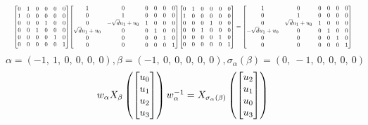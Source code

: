 \documentclass[11pt]{article}
\theoremstyle{definition}
\begin{document}
\[
\scaletoalign{\textwidth}{{\left[\begin{matrix}0 & 1 & 0 & 0 & 0 & 0\\1 & 0 & 0 & 0 & 0 & 0\\0 & 0 & 0 & 1 & 0 & 0\\0 & 0 & 1 & 0 & 0 & 0\\0 & 0 & 0 & 0 & 1 & 0\\0 & 0 & 0 & 0 & 0 & 1\end{matrix}\right]} {\left[\begin{matrix}1 & 0 & 0 & 0 & 0 & 0\\0 & 1 & 0 & 0 & 0 & 0\\0 & - \sqrt{d} u_{1} + u_{0} & 1 & 0 & 0 & 0\\\sqrt{d} u_{1} + u_{0} & 0 & 0 & 1 & 0 & 0\\0 & 0 & 0 & 0 & 1 & 0\\0 & 0 & 0 & 0 & 0 & 1\end{matrix}\right]} {\left[\begin{matrix}0 & 1 & 0 & 0 & 0 & 0\\1 & 0 & 0 & 0 & 0 & 0\\0 & 0 & 0 & 1 & 0 & 0\\0 & 0 & 1 & 0 & 0 & 0\\0 & 0 & 0 & 0 & 1 & 0\\0 & 0 & 0 & 0 & 0 & 1\end{matrix}\right]} = {\left[\begin{matrix}1 & 0 & 0 & 0 & 0 & 0\\0 & 1 & 0 & 0 & 0 & 0\\0 & \sqrt{d} u_{1} + u_{0} & 1 & 0 & 0 & 0\\- \sqrt{d} u_{1} + u_{0} & 0 & 0 & 1 & 0 & 0\\0 & 0 & 0 & 0 & 1 & 0\\0 & 0 & 0 & 0 & 0 & 1\end{matrix}\right]}}
\]
\[
\alpha = \left( -1, \  1, \  0, \  0, \  0, \  0\right), \beta = \left( -1, \  0, \  0, \  0, \  0, \  0\right), \sigma_{\alpha}(\beta) = \left( 0, \  -1, \  0, \  0, \  0, \  0\right)
\]
\[
\scaletoalign{\textwidth}{w_{\alpha} X_{\beta}\left(\left[\begin{matrix}u_{0}\\u_{1}\\u_{2}\\u_{3}\end{matrix}\right]\right) w_{\alpha}^{-1} = X_{\sigma_{\alpha}\left(\beta\right)}\left(\left[\begin{matrix}u_{2}\\u_{1}\\u_{0}\\u_{3}\end{matrix}\right]\right)}
\]
\end{document}
